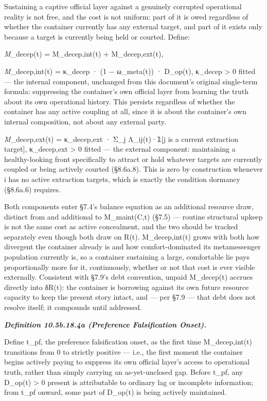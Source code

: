 \documentclass[
]{article}
\begin{document}
Sustaining a captive official layer against a genuinely corrupted
operational reality is not free, and the cost is not uniform: part of it
is owed regardless of whether the container currently has any external
target, and part of it exists only because a target is currently being
held or courted. Define:

\emph{M}\_decep(t) = M\_decep,int(t) + M\_decep,ext(t),

\emph{M}\_decep,int(t) = κ\_decep · (1 − ω\_meta(t)) · D\_op(t),
κ\_decep \textgreater{} 0 fitted --- the internal component, unchanged
from this document's original single-term formula: suppressing the
container's own official layer from learning the truth about its own
operational history. This persists regardless of whether the container
has any active coupling at all, since it is about the container's own
internal composition, not about any external party.

\emph{M}\_decep,ext(t) = κ\_decep,ext · Σ\_j Λ\_ij(t)·𝟙{[}j is a current
extraction target{]}, κ\_decep,ext \textgreater{} 0 fitted --- the
external component: maintaining a healthy-looking front specifically to
attract or hold whatever targets are currently coupled or being actively
courted (§8.6a.8). This is zero by construction whenever i has no active
extraction targets, which is exactly the condition dormancy (§8.6a.6)
requires.

Both components enter §7.4's balance equation as an additional resource
draw, distinct from and additional to M\_maint(C,t) (§7.5) --- routine
structural upkeep is not the same cost as active concealment, and the
two should be tracked separately even though both draw on R(t).
M\_decep,int(t) grows with both how divergent the container already is
and how comfort-dominated its metamessenger population currently is, so
a container sustaining a large, comfortable lie pays proportionally more
for it, continuously, whether or not that cost is ever visible
externally. Consistent with §7.9's debt convention, unpaid M\_decep(t)
accrues directly into δR(t): the container is borrowing against its own
future resource capacity to keep the present story intact, and --- per
§7.9 --- that debt does not resolve itself; it compounds until
addressed.

\emph{\textbf{Definition 10.5b.18.4a (Preference Falsification Onset).}}

Define t\_pf, the preference falsification onset, as the first time
M\_decep,int(t) transitions from 0 to strictly positive --- i.e., the
first moment the container begins actively paying to suppress its own
official layer's access to operational truth, rather than simply
carrying an as-yet-unclosed gap. Before t\_pf, any D\_op(t)
\textgreater{} 0 present is attributable to ordinary lag or incomplete
information; from t\_pf onward, some part of D\_op(t) is being actively
maintained.
\end{document}

